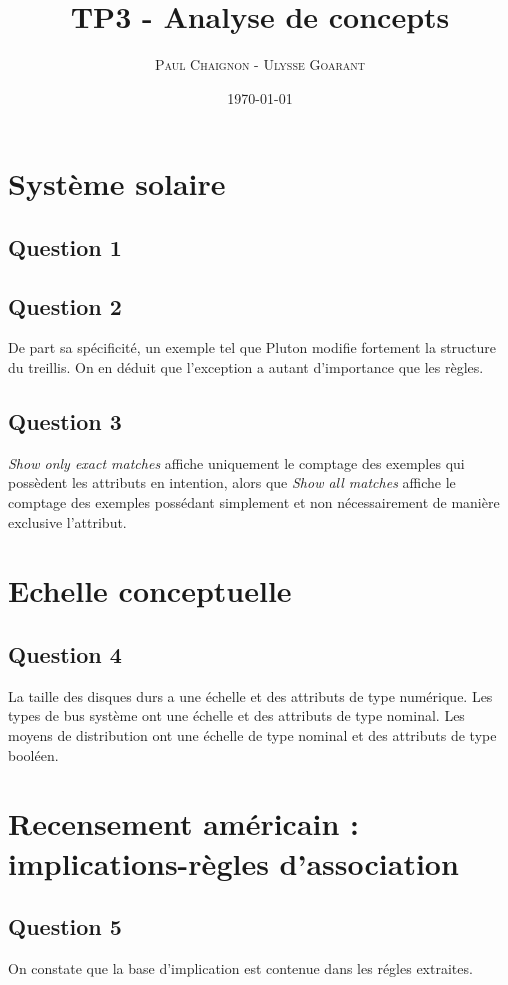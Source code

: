 \documentclass[a4paper,12pt]{article}
\title{TP3 - Analyse de concepts}
\author{\textsc{Paul Chaignon} - \textsc{Ulysse Goarant}}
\date{\today}
\begin{document}
\lstset{language=Prolog, breaklines=true}

\maketitle

\section{Système solaire}
\subsection{Question 1}

\subsection{Question 2}
De part sa spécificité, un exemple tel que Pluton modifie fortement la structure du treillis. On en déduit que l'exception a autant d'importance que les règles.

\subsection{Question 3}
\textit{Show only exact matches} affiche uniquement le comptage des exemples qui possèdent les attributs en intention, alors que \textit{Show all matches} affiche le comptage des exemples possédant simplement et non nécessairement de manière exclusive l'attribut.

\section{Echelle conceptuelle}
\subsection{Question 4}
La taille des disques durs a une échelle et des attributs de type numérique. Les types de bus système ont une échelle et des attributs de type nominal. Les moyens de distribution ont une échelle de type nominal et des attributs de type booléen.

\section{Recensement américain : implications-règles d'association}
\subsection{Question 5}
On constate que la base d'implication est contenue dans les régles extraites.
\end{document}
